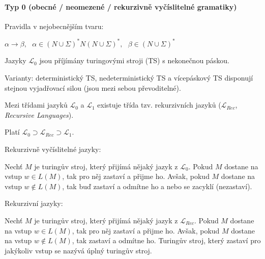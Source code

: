 \paragraph*{Typ 0 (obecné / neomezené / rekurzivně vyčíslitelné gramatiky)} \begin{compactitem}
    \item Pravidla v nejobecnějším tvaru: \begin{compactitem}
        \item $\alpha \rightarrow \beta,~~~ \alpha \in (N \cup \Sigma)^* N (N \cup \Sigma)^*,~~~ \beta \in (N \cup \Sigma)^*$
    \end{compactitem}

    \item Jazyky $\mathcal{L}_0$ jsou příjímány turingovými stroji (TS) s nekonečnou páskou. \begin{compactitem}
        \item Varianty: deterministický TS, nedeterministický TS a vícepáskový TS disponují stejnou vyjadřovací silou (jsou mezi sebou převoditelné).
    \end{compactitem}

    \item Mezi třídami jazyků $\mathcal{L}_0$ a $\mathcal{L}_1$ existuje třída tzv. rekurzivních jazyků ($\mathcal{L}_{Rec}$, \textit{Recursive Languages}). \begin{compactitem}
        \item Platí $\mathcal{L}_0 \supset \mathcal{L}_{Rec} \supset \mathcal{L}_1$.

        \item Rekurzivně vyčíslitelné jazyky: \begin{compactitem}
            \item Nechť $M$ je turingův stroj, který přijímá nějaký jazyk z $\mathcal{L}_0$. Pokud $M$ dostane na vstup $w \in L(M)$, tak pro něj zastaví a přijme ho. Avšak, pokud $M$ dostane na vstup $w \not\in L(M)$, tak buď zastaví a odmítne ho a nebo se zacyklí (nezastaví).
        \end{compactitem}

        \item Rekurzivní jazyky: \begin{compactitem}
            \item Nechť $M$ je turingův stroj, který přijímá nějaký jazyk z $\mathcal{L}_{Rec}$. Pokud $M$ dostane na vstup $w \in L(M)$, tak pro něj zastaví a přijme ho. Avšak, pokud $M$ dostane na vstup $w \not\in L(M)$, tak zastaví a odmítne ho. Turingův stroj, který zastaví pro jakýkoliv vstup se nazývá úplný turingův stroj.
        \end{compactitem}
    \end{compactitem}
\end{compactitem}

